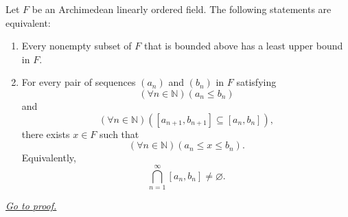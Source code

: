 \begin{theorem}
\label{thm:lub-property-equivalent-nested-interval-property}
Let $F$ be an Archimedean linearly ordered field.  The following statements are
equivalent:
\begin{enumerate}[label=(\roman*)]
  \item Every nonempty subset of $F$ that is bounded above has a least upper
  bound in $F$.
  \item For every pair of sequences $(a_n)$ and $(b_n)$ in $F$ satisfying
  \[
    (\forall n\in\mathbb{N})(a_n\leq b_n)
  \]
  and
  \[
    (\forall n\in\mathbb{N})([a_{n+1},b_{n+1}]\subseteq [a_n,b_n]),
  \]
  there exists $x\in F$ such that
  \[
    (\forall n\in\mathbb{N})(a_n\leq x\leq b_n).
  \]
  Equivalently,
  \[
    \bigcap_{n=1}^{\infty}[a_n,b_n]\neq\varnothing.
  \]
\end{enumerate}

\smallskip
\noindent
\hyperref[prf:lub-property-equivalent-nested-interval-property]{\textit{Go to proof.}}
\end{theorem}